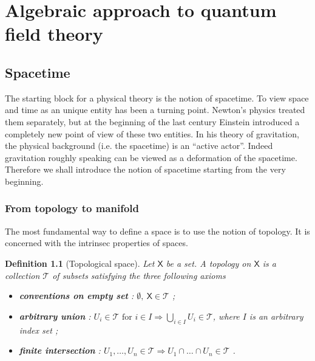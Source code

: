 \documentclass[11pt]{book}
\newcommand{\Tcal}{\mathcal{T}}
\newcommand{\Xsf}{\mathsf{X}}
\theoremstyle{break}
\newtheorem{definition}{Definition}
\begin{document}


\part{Algebraic approach to quantum field theory}

\chapter{Spacetime}



The starting block for a physical theory is the notion of spacetime. To view space and time as an unique entity has been a turning point. Newton's physics treated them separately, but at the beginning of the last century Einstein introduced a completely new point of view of these two entities. In his theory of gravitation, the physical background (i.e. the spacetime) is an ``active actor''. Indeed gravitation roughly speaking can be viewed as a deformation of the spacetime. Therefore we shall introduce the notion of spacetime starting from the very beginning.


\section{From topology to manifold}

The most fundamental way to define a space is to use the notion of topology. It is concerned with the intrinsec properties of spaces.

\begin{definition}[Topological space] 
Let $\Xsf$ be a set. A topology on $\Xsf$ is a collection $\Tcal$ of subsets satisfying the three following axioms%
%
\begin{itemize}
\item \textbf{conventions on empty set} : $\emptyset , \ \Xsf \in \Tcal$ ;
\item \textbf{arbitrary union} : $U_i \in \Tcal \mbox{ for } i \in I \Longrightarrow \bigcup_{i\in I} U_i \in \Tcal$, where $I$ is an arbitrary index set ;
\item \textbf{finite intersection} : $U_1 , \dots , U_n \in \Tcal \Longrightarrow U_1 \cap \dots \cap U_n \in \Tcal$ .
\end{itemize}
%
\end{definition}
\end{document}
